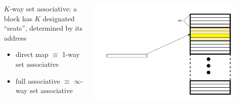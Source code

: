 \documentclass[12pt,dvipdfmx]{beamer}
\newcommand{\aka}[1]{{\color{red}#1}}
\begin{document}
\begin{frame}
\begin{itemize}
\begin{columns}
\begin{column}{0.3\textwidth}
  \end{column}
\end{columns}

\begin{columns}
  \begin{column}{0.65\textwidth}
\aka{$K$-way set associative:} a block has $K$
  designated ``seats'', determined by its address
  \begin{itemize}
  \item direct map $\equiv$ 1-way set associative
  \item full associative $\equiv$ $\infty$-way set associative
  \end{itemize}
\end{column}
  \begin{column}{0.3\textwidth}
\includegraphics[width=0.9\textwidth]{out/pdf/svg/associativity_3.pdf}

  \end{column}
\end{columns}
\end{itemize}
\end{frame}
\end{document}
